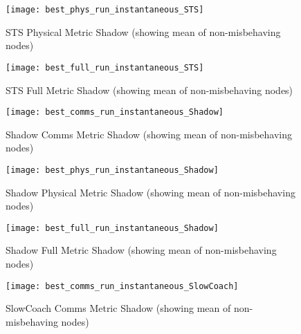 \documentclass[aspectratio=169]{beamer}
\begin{document}
\begin{frame}\begin{figure}[h]
	\centering
	\texttt{[image: best\_phys\_run\_instantaneous\_STS]}
	\caption{STS Physical Metric Shadow (showing mean of non-misbehaving nodes)}
	\label{fig:phys_instantaneous_sts}
\end{figure}\end{frame}

\begin{frame}\begin{figure}[h]
	\centering
	\texttt{[image: best\_full\_run\_instantaneous\_STS]}
	\caption{STS Full Metric Shadow (showing mean of non-misbehaving nodes)}
	\label{fig:full_instantaneous_sts}
\end{figure}\end{frame}



\begin{frame}\begin{figure}[h]
	\centering
	\texttt{[image: best\_comms\_run\_instantaneous\_Shadow]}
	\caption{Shadow Comms Metric Shadow (showing mean of non-misbehaving nodes)}
	\label{fig:comms_instantaneous_shadow}
\end{figure}\end{frame}

\begin{frame}\begin{figure}[h]
	\centering
	\texttt{[image: best\_phys\_run\_instantaneous\_Shadow]}
	\caption{Shadow Physical Metric Shadow (showing mean of non-misbehaving nodes)}
	\label{fig:phys_instantaneous_shadow}
\end{figure}\end{frame}

\begin{frame}\begin{figure}[h]
	\centering
	\texttt{[image: best\_full\_run\_instantaneous\_Shadow]}
	\caption{Shadow Full Metric Shadow (showing mean of non-misbehaving nodes)}
	\label{fig:full_instantaneous_shadow}
\end{figure}\end{frame}



\begin{frame}\begin{figure}[h]
	\centering
	\texttt{[image: best\_comms\_run\_instantaneous\_SlowCoach]}
	\caption{SlowCoach Comms Metric Shadow (showing mean of non-misbehaving nodes)}
	\label{fig:comms_instantaneous_slowcoach}
\end{figure}\end{frame}
\end{document}
